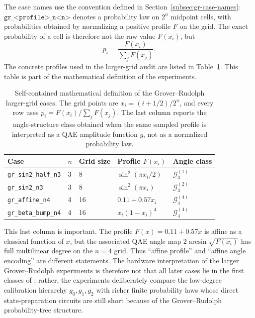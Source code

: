 The case names use the convention defined in
Section~\ref{subsec:gr-case-names}: \(\texttt{gr\_<profile>\_n<n>}\) denotes a
probability law on \(2^n\) midpoint cells, with probabilities obtained by
normalizing a positive profile \(F\) on the grid. The exact probability of a
cell is therefore not the raw value \(F(x_i)\), but
\[
  p_i=\frac{F(x_i)}{\sum_j F(x_j)}.
\]
The concrete profiles used in the larger-grid audit are listed in
Table~\ref{tab:gr-case-definitions}. This table is part of the mathematical
definition of the experiments.

\begin{table}[h]
\centering
\begin{tabular}{lllll}
\toprule
Case & \(n\) & Grid size & Profile \(F(x_i)\) & Angle class \\
\midrule
\texttt{gr\_sin2\_half\_n3} & 3 & 8
  & \(\sin^2(\pi x_i/2)\) & \(\mathcal{G}^{(1)}_3\) \\
\texttt{gr\_sin2\_n3} & 3 & 8
  & \(\sin^2(\pi x_i)\) & \(\mathcal{G}^{(2)}_3\) \\
\texttt{gr\_affine\_n4} & 4 & 16
  & \(0.11+0.57x_i\) & \(\mathcal{G}^{(4)}_4\) \\
\texttt{gr\_beta\_bump\_n4} & 4 & 16
  & \(x_i(1-x_i)^4\) & \(\mathcal{G}^{(4)}_4\) \\
\bottomrule
\end{tabular}
\caption{Self-contained mathematical definition of the Grover--Rudolph
larger-grid cases. The grid points are \(x_i=(i+1/2)/2^n\), and every row uses
\(p_i=F(x_i)/\sum_j F(x_j)\). The last column reports the angle-structure class
obtained when the same sampled profile is interpreted as a QAE amplitude
function \(g\), not as a normalized probability law.}
\label{tab:gr-case-definitions}
\end{table}

This last column is important. The profile \(F(x)=0.11+0.57x\) is affine as a
classical function of \(x\), but the associated QAE angle map
\(2\arcsin\sqrt{F(x_i)}\) has full multilinear degree on the \(n=4\) grid. Thus
``affine profile'' and ``affine angle encoding'' are different statements. The
hardware interpretation of the larger Grover--Rudolph experiments is therefore
not that all later cases lie in the first classes of
\cite{chinesta2026encoding}; rather, the experiments deliberately compare the
low-degree calibration hierarchy \(g_0,g_1,g_2\) with richer finite probability
laws whose direct state-preparation circuits are still short because of the
Grover--Rudolph probability-tree structure.


